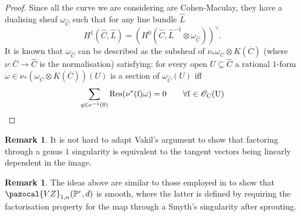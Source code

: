 \documentclass[11pt]{amsart}
\newcommand{\PP}{\mathbb P}
\newcommand{\OO}{\mathcal O}
\renewcommand{\to}{\rightarrow}
\theoremstyle{plain}
\theoremstyle{definition}
\newtheorem{remark}[thm]{Remark}
\begin{document}
\begin{proof}
Since all the curve we are considering are Cohen-Maculay, they have a dualising sheaf $\omega_{\hat{C}}$ such that for any line bundle $\hat{L}$
\[H^1(\hat{C},\hat{L})=(H^0(\hat{C},\hat{L}^{-1}\otimes\omega_{\hat{C}}))^{\vee}.\]
It is known \cite[IV, \S~3]{serre} that  $\omega_{\hat{C}}$ can be described as the subsheaf of $\nu_* \omega_{\overline{C}}\otimes K(\overline{C})$ (where $\nu\colon\bar C\to\hat C$ is the normalisation) satisfying: for every open $U\subseteq\hat C$ a rational $1$-form $\omega\in \nu_*\left( \omega_{\overline{C}}\otimes K(\overline{C})\right)(U)$ is a section of $\omega_{\hat C}(U)$ iff
\[\sum_{q\in \nu^{-1}(0)}\rm{Res}(\nu^*(f)\omega) =0 \quad \quad \forall f\in\OO_C(U)\]

 
  
  \end{proof}






\begin{remark}
It is not hard to adapt Vakil's argument \cite{Vre} to show that factoring through a genus $1$ singularity is equivalent to the tangent vectors being linearly dependent in the image.
\end{remark}
\begin{remark}
The ideas above are similar to those employed in \cite[Theorem 4.5.1]{RSPW} to show that $\pazocal{VZ}_{1,n}(\PP^r,d)$ is smooth, where the latter is defined by requiring the factorisation property for the map through a Smyth's singularity after sprouting.
\end{remark}
\end{document}
